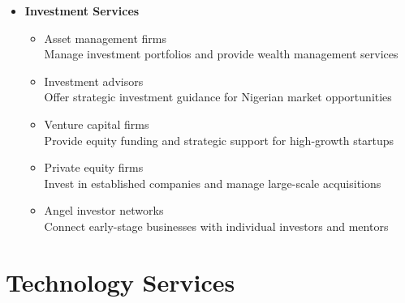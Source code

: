 \begin{tcolorbox}[
    colback=white,
    colframe=primarydark,
    title=\textbf{Financial Service Providers},
    before skip=1em,
    after skip=1em
]
\begin{itemize}[leftmargin=*,itemsep=0.5em]
        \vspace{0.5em}

        \item \textbf{Investment Services}
        \begin{itemize}[itemsep=0.3em]
            \item Asset management firms \\
                \small{Manage investment portfolios and provide wealth management services}
            \item Investment advisors \\
                \small{Offer strategic investment guidance for Nigerian market opportunities}
            \item Venture capital firms \\
                \small{Provide equity funding and strategic support for high-growth startups}
            \item Private equity firms \\
                \small{Invest in established companies and manage large-scale acquisitions}
            \item Angel investor networks \\
                \small{Connect early-stage businesses with individual investors and mentors}
        \end{itemize}
    \end{itemize}
\end{tcolorbox}

\section{Technology Services}\label{sec:technology-services}
\vspace{1em}

